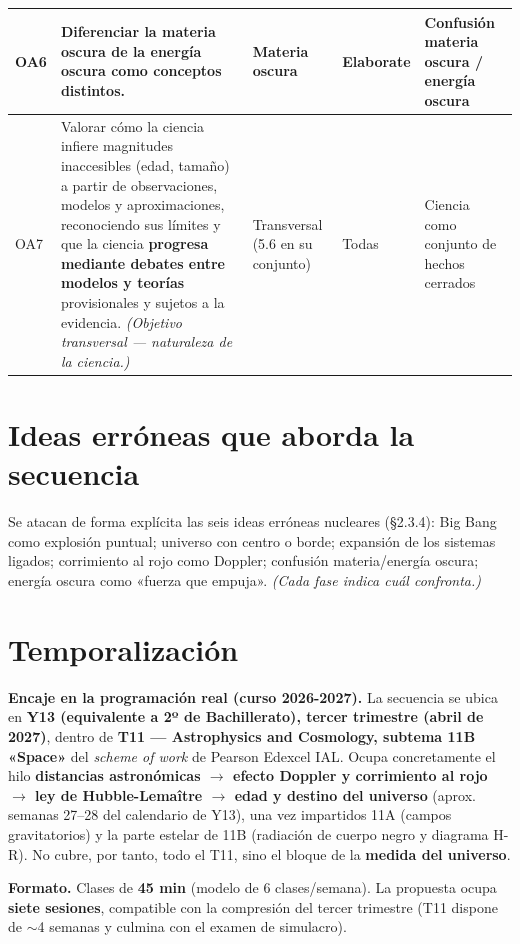 \begin{longtable}{>{\raggedright\arraybackslash}p{0.9cm} >{\raggedright\arraybackslash}p{5.3cm} >{\raggedright\arraybackslash}p{3.0cm} >{\raggedright\arraybackslash}p{1.5cm} >{\raggedright\arraybackslash}p{3.6cm}}
OA6 & Diferenciar la materia oscura de la energía oscura como conceptos distintos. & Materia oscura & Elaborate & Confusión materia oscura / energía oscura \\ \hline
OA7 & Valorar cómo la ciencia infiere magnitudes inaccesibles (edad, tamaño) a partir de observaciones, modelos y aproximaciones, reconociendo sus límites y que la ciencia \textbf{progresa mediante debates entre modelos y teorías} provisionales y sujetos a la evidencia. \textit{(Objetivo transversal --- naturaleza de la ciencia.)} & Transversal (5.6 en su conjunto) & Todas & Ciencia como conjunto de hechos cerrados \\ \hline
\end{longtable}

\section{Ideas erróneas que aborda la secuencia}\label{sec:ideaserroneas}

Se atacan de forma explícita las seis ideas erróneas nucleares (§2.3.4): Big Bang como explosión puntual; universo con centro o borde; expansión de los sistemas ligados; corrimiento al rojo como Doppler; confusión materia/energía oscura; energía oscura como «fuerza que empuja». \textit{(Cada fase indica cuál confronta.)}

\section{Temporalización}\label{sec:temporalizacion}

\textbf{Encaje en la programación real (curso 2026-2027).} La secuencia se ubica en \textbf{Y13 (equivalente a 2º de Bachillerato), tercer trimestre (abril de 2027)}, dentro de \textbf{T11 --- Astrophysics and Cosmology, subtema 11B «Space»} del \textit{scheme of work} de Pearson Edexcel IAL. Ocupa concretamente el hilo \textbf{distancias astronómicas $\rightarrow$ efecto Doppler y corrimiento al rojo $\rightarrow$ ley de Hubble-Lemaître $\rightarrow$ edad y destino del universo} (aprox. semanas 27--28 del calendario de Y13), una vez impartidos 11A (campos gravitatorios) y la parte estelar de 11B (radiación de cuerpo negro y diagrama H-R). No cubre, por tanto, todo el T11, sino el bloque de la \textbf{medida del universo}.

\textbf{Formato.} Clases de \textbf{45 min} (modelo de 6 clases/semana). La propuesta ocupa \textbf{siete sesiones}, compatible con la compresión del tercer trimestre (T11 dispone de $\sim$4 semanas y culmina con el examen de simulacro).


